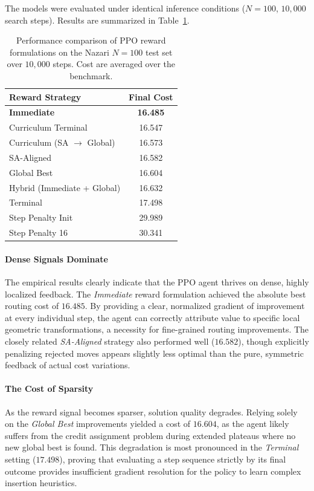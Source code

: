 \documentclass[letterpaper]{article} %
\begin{document}
The models were evaluated under identical inference conditions ($N=100$, $10{,}000$ search steps). Results are summarized in Table~\ref{tab:reward_formulations}.

\begin{table}[t]
\centering
\small
\caption{Performance comparison of PPO reward formulations on the Nazari $N=100$ test set over $10{,}000$ steps. Cost are averaged over the benchmark.}
\label{tab:reward_formulations}
\begin{tabular}{l c}
\toprule
\textbf{Reward Strategy} & \textbf{Final Cost}\\
\midrule
\textbf{Immediate} & \textbf{16.485} \\
Curriculum Terminal & 16.547 \\
Curriculum (SA $\to$ Global) & 16.573  \\
SA-Aligned & 16.582  \\
Global Best & 16.604  \\
Hybrid (Immediate + Global) & 16.632  \\
Terminal & 17.498 \\
Step Penalty Init & 29.989  \\
Step Penalty 16 & 30.341 \\
\bottomrule
\end{tabular}
\end{table}

\paragraph{Dense Signals Dominate}
The empirical results clearly indicate that the PPO agent thrives on dense, highly localized feedback. The \textit{Immediate} reward formulation achieved the absolute best routing cost of $16.485$. By providing a clear, normalized gradient of improvement at every individual step, the agent can correctly attribute value to specific local geometric transformations, a necessity for fine-grained routing improvements. The closely related \textit{SA-Aligned} strategy also performed well ($16.582$), though explicitly penalizing rejected moves appears slightly less optimal than the pure, symmetric feedback of actual cost variations.

\paragraph{The Cost of Sparsity}
As the reward signal becomes sparser, solution quality degrades. Relying solely on the \textit{Global Best} improvements yielded a cost of $16.604$, as the agent likely suffers from the credit assignment problem during extended plateaus where no new global best is found. This degradation is most pronounced in the \textit{Terminal} setting ($17.498$), proving that evaluating a step sequence strictly by its final outcome provides insufficient gradient resolution for the policy to learn complex insertion heuristics.
\end{document}
